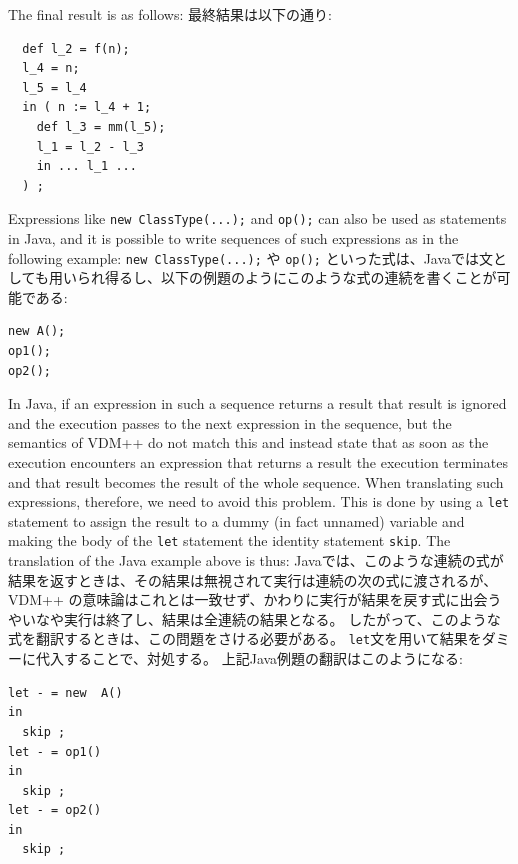 \documentclass[\pformat,12pt]{jarticle}
\begin{document}
The final result is as follows:
最終結果は以下の通り:

\begin{small}
\begin{verbatim}
  def l_2 = f(n);
  l_4 = n;
  l_5 = l_4
  in ( n := l_4 + 1;
    def l_3 = mm(l_5);
    l_1 = l_2 - l_3
    in ... l_1 ...
  ) ;

\end{verbatim}
\end{small}


Expressions like \texttt{new ClassType(...);} and \texttt{op();} can
also be used as statements in Java, and it is possible to write
sequences of such expressions as in the following example:
\texttt{new ClassType(...);} や \texttt{op();} といった式は、Javaでは文としても用いられ得るし、以下の例題のようにこのような式の連続を書くことが可能である:

\begin{small}
\begin{verbatim}
new A();
op1();
op2();
\end{verbatim}
\end{small}

In Java, if an expression in such a sequence returns a result that
result is ignored and the execution passes to the next expression in
the sequence, but the semantics of VDM++ do not match this and instead
state that as soon as the execution encounters an expression that
returns a result the execution terminates and that result becomes the
result of the whole sequence. When translating such expressions,
therefore, we need to avoid this problem. This is done by using a
\texttt{let} statement to assign the result to a dummy (in fact
unnamed) variable and making the body of the \texttt{let} statement
the identity statement \texttt{skip}. The translation of the Java
example above is thus:
Javaでは、このような連続の式が結果を返すときは、その結果は無視されて実行は連続の次の式に渡されるが、 VDM++ の意味論はこれとは一致せず、かわりに実行が結果を戻す式に出会うやいなや実行は終了し、結果は全連続の結果となる。
したがって、このような式を翻訳するときは、この問題をさける必要がある。
\texttt{let}文を用いて結果をダミーに代入することで、対処する。
上記Java例題の翻訳はこのようになる:

\begin{small}
\begin{verbatim}
let - = new  A()
in 
  skip ;
let - = op1()
in 
  skip ;
let - = op2()
in 
  skip ;
\end{verbatim}
\end{small}
\end{document}
